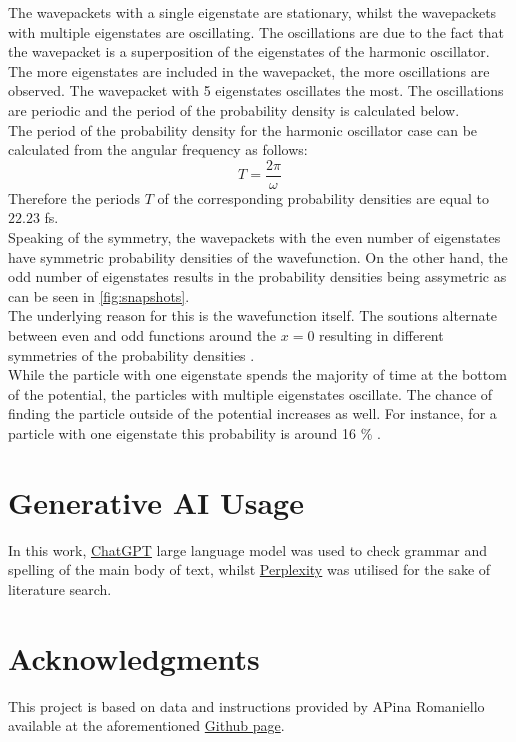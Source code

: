 \documentclass[12pt]{article}
\begin{document}
The wavepackets with a single eigenstate are stationary, whilst the wavepackets with multiple eigenstates are oscillating. The oscillations are due to the fact that the wavepacket is a superposition of the eigenstates of the harmonic oscillator. The more eigenstates are included in the wavepacket, the more oscillations are observed. The wavepacket with 5 eigenstates oscillates the most. The oscillations are periodic and the period of the probability density is calculated below. \\

The period of the probability density for the harmonic oscillator case can be calculated from the angular frequency as follows:
\begin{equation}
    T = \frac{2\pi}{\omega}
\label{eq:period}
\end{equation}
Therefore the periods $T$ of the corresponding probability densities are equal to $22.23$ fs. \\

Speaking of the symmetry, the wavepackets with the even number of eigenstates have symmetric probability densities of the wavefunction. On the other hand, the odd number of eigenstates results in the probability densities being assymetric as can be seen in \autoref{fig:snapshots}. \\

The underlying reason for this is the wavefunction itself. The soutions alternate between even and odd functions around the $x = 0$ resulting in different symmetries of the probability densities \citep{quant_harmonic_osc}. \\

While the particle with one eigenstate spends the majority of time at the bottom of the potential, the particles with multiple eigenstates oscillate. The chance of finding the particle outside of the potential increases as well. For instance, for a particle with one eigenstate this probability is around 16 \% \citep{the_quant_harmonic_osc}. \\

\section*{Generative AI Usage}
In this work, \href{https://chatgpt.com}{ChatGPT} large language model was used to check grammar and spelling of the main body of text, whilst \href{https://www.perplexity.ai}{Perplexity} was utilised for the sake of literature search.

\section*{Acknowledgments}
This project is based on data and instructions provided by APina Romaniello available at the aforementioned \href{https://github.com/almakhmudov/LTTC-Homework--QD}{Github page}.


\end{document}
